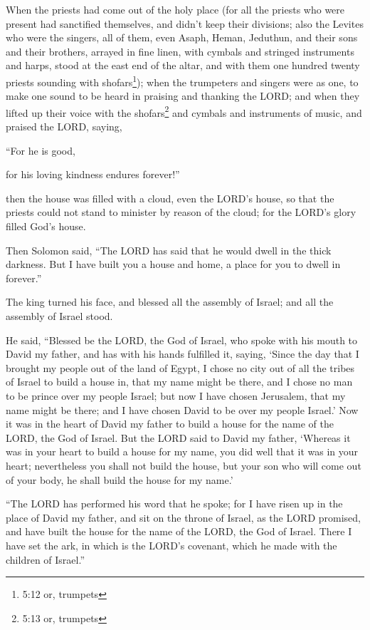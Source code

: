 \myverse{}When the priests had come out of the holy place (for all the
priests who were present had sanctified themselves, and didn’t keep their divisions;
\myverse{}also the Levites who were the singers, all of them, even Asaph, Heman, Jeduthun,
and their sons and their brothers, arrayed in fine linen, with cymbals and stringed instruments and harps,
stood at the east end of the altar, and with them one hundred twenty priests sounding with shofars\footnote{5:12 or, trumpets});
\myverse{}when the trumpeters and singers were as one, to make one sound to be heard
in praising and thanking the LORD; and when they lifted up their voice with the shofars\footnote{5:13 or, trumpets}
and cymbals and instruments of music, and praised the LORD, saying,

“For he is good,

for his loving kindness endures forever!”

then the house was filled with a cloud, even the LORD’s house,
\myverse{}so that the priests could not stand to minister by reason of the cloud; for
the LORD’s glory filled God’s house.


\mychapter{} \myverse*{}Then Solomon said, “The LORD has said that he would dwell in the
thick darkness.
\myverse{}But I have built you a house and home, a place for you to dwell in forever.”

\myverse{}The king turned his face, and blessed all the assembly of Israel;
and all the assembly of Israel stood.

\myverse{}He said, “Blessed be the LORD, the God of Israel, who spoke with
his mouth to David my father, and has with his hands fulfilled it, saying,
\myverse{}‘Since the day that I brought my people out of the land of Egypt, I chose no
city out of all the tribes of Israel to build a house in, that my name might be there, and I chose no
man to be prince over my people Israel;
\myverse{}but now I have chosen Jerusalem, that my name might be there; and I have chosen
David to be over my people Israel.’
\myverse{}Now it was in the heart of David my father to build a house for the name of
the LORD, the God of Israel.
\myverse{}But the LORD said to David my father, ‘Whereas it was in your heart to build
a house for my name, you did well that it was in your heart;
\myverse{}nevertheless you shall not build the house, but your son who will come out of
your body, he shall build the house for my name.’

\myverse{}“The LORD has performed his word that he spoke; for I have risen
up in the place of David my father, and sit on the throne of Israel, as the LORD promised, and have built
the house for the name of the LORD, the God of Israel.
\myverse{}There I have set the ark, in which is the LORD’s covenant, which he made with
the children of Israel.”

